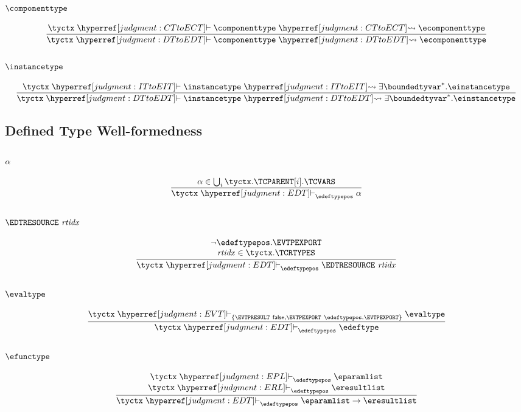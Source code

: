 \subsubsection{$\componenttype$}
\[
  \frac{
    \tyctx \vdashh!CTtoECT! \componenttype \leadstoh!CTtoECT! \ecomponenttype
  }{
    \tyctx \vdashh!DTtoEDT! \componenttype \leadstoh!DTtoEDT! \ecomponenttype
  }
\]

\subsubsection{$\instancetype$}
\[
  \frac{
    \tyctx \vdashh!ITtoEIT! \instancetype \leadstoh!ITtoEIT! \exists \boundedtyvar^\ast. \einstancetype
  }{
    \tyctx \vdashh!DTtoEDT! \instancetype \leadstoh!DTtoEDT! \exists \boundedtyvar^\ast. \einstancetype
  }
\]

\subsection{Defined Type Well-formedness}
\label{judgment:EDT}

\subsubsection{$\alpha$}
\[
  \frac{
    \tyvar \in \bigcup_i \tyctx.\TCPARENT[i].\TCVARS
  }{
    \tyctx \vdashh!EDT!_\edeftypepos \tyvar
  }
\]

\subsubsection{$\EDTRESOURCE~\rtidx$}
\[
  \frac{
    \begin{array}{@{}c@{}}
    \neg \edeftypepos.\EVTPEXPORT \\
    \rtidx \in \tyctx.\TCRTYPES\\
    \end{array}
  }{
    \tyctx \vdashh!EDT!_\edeftypepos \EDTRESOURCE~\rtidx
  }
\]

\subsubsection{$\evaltype$}
\[
  \frac{
    \tyctx \vdashh!EVT!_{\{\EVTPRESULT~\false,\EVTPEXPORT~\edeftypepos.\EVTPEXPORT\}} \evaltype
  }{
    \tyctx \vdashh!EDT!_\edeftypepos \edeftype
  }
\]

\subsubsection{$\efunctype$}
\[
  \frac{
    \begin{array}{@{}c@{}}
      \tyctx \vdashh!EPL!_\edeftypepos \eparamlist\\
      \tyctx \vdashh!ERL!_\edeftypepos \eresultlist\\
    \end{array}
  }{
    \tyctx \vdashh!EDT!_\edeftypepos \eparamlist\to\eresultlist
  }
\]


